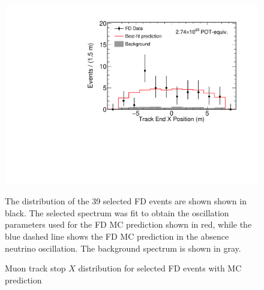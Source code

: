\begin{figure}
\begin{center}
\includegraphics[width=\textwidth]{figures/results/fd_data_mc_numi_plots/trkEndX_unblind.pdf}
\end{center}
\caption{ Muon track stop $X$ distribution for selected FD events with MC prediction }{
The distribution of the 39 selected FD events are shown shown in black.
The selected spectrum was fit to obtain the oscillation parameters used
for the FD MC prediction shown in red, while
the blue dashed line shows the FD MC prediction in the absence neutrino
oscillation.
The background spectrum is shown in gray.
}
\label{trkEndX_unblind}

\end{figure}



